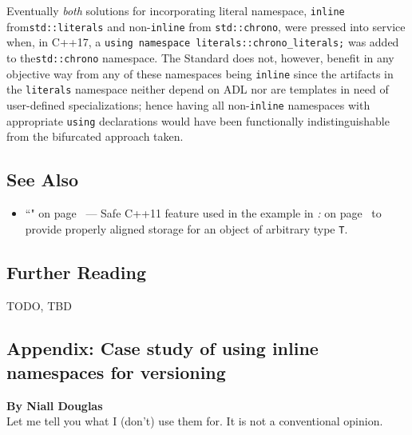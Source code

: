 Eventually \emph{both} solutions for incorporating literal namespace,
\texttt{inline} from\linebreak[4] \texttt{std::literals} and non-\texttt{inline} from
\texttt{std::chrono}, were pressed into service when, in C++17, a
\mbox{\texttt{using}~\texttt{namespace}~\texttt{literals::chrono\_literals;}}
was added to the\linebreak[4]
 \texttt{std::chrono} namespace. The Standard does not, however, benefit in any objective way from any of
these namespaces being \texttt{inline} since the artifacts in the
\texttt{literals} namespace neither depend on ADL nor are templates in
need of user-defined specializations; hence having all
non-\texttt{inline} namespaces with appropriate \texttt{using}
declarations would have been functionally indistinguishable from the
bifurcated approach taken.

\subsection[See Also]{See Also}\label{see-also}

\begin{itemize}
\item{``" on page~\pageref{alignas} — Safe C++11 feature used in the example in  \textit{: } on page~\pageref{build-modes-and-abi-link-safety} to provide properly aligned storage for an object of arbitrary type \texttt{T}.}
\end{itemize}

\subsection[Further Reading]{Further Reading}\label{further-reading}

TODO, TBD

\subsection[Appendix: Case study of using {\tt inline} namespaces for versioning]{Appendix: Case study of using {\SubsecCode inline} namespaces for versioning}\label{appendix:-case-study-of-using-inline-namespaces-for-versioning}

\noindent\textbf{By Niall Douglas}\\[.5ex]

\noindent Let me tell you what I (don't) use them for. It is not a conventional
opinion.

